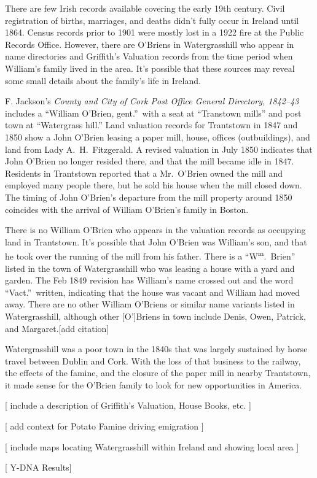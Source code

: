 There are few Irish records available covering the early 19th century. Civil registration of births, marriages, and deaths didn't fully occur in Ireland until 1864.\cite{Grenham1} Census records prior to 1901 were mostly lost in a 1922 fire at the Public Records Office.\cite{Grenham18} However, there are O'Briens in Watergrasshill who appear in name directories and Griffith's Valuation records from the time period when William's family lived in the area. It's possible that these sources may reveal some small details about the family's life in Ireland.

F. Jackson's \textit{County and City of Cork Post Office General Directory, 1842--43} includes a ``William O'Brien, gent.''\ with a seat at ``Transtown mills'' and post town at ``Watergrass hill.''\cite{Jacksons} Land valuation records for Trantstown in 1847 and 1850 show a John O'Brien leasing a paper mill, house, offices (outbuildings), and land from Lady A.\ H.\ Fitzgerald.\cite{Peramb1847,Peramb1850} A revised valuation in July 1850 indicates that John O'Brien no longer resided there, and that the mill became idle in 1847.\cite{House1850} Residents in Trantstown reported that a Mr.\ O'Brien owned the mill and employed many people there, but he sold his house when the mill closed down.\cite{PaperMill} The timing of John O'Brien's departure from the mill property around 1850 coincides with the arrival of William O'Brien's family in Boston.

There is no William O'Brien who appears in the valuation records as occupying land in Trantstown. It's possible that John O'Brien was William's son, and that he took over the running of the mill from his father. There is a ``W\textsuperscript{m}.\ Brien'' listed in the town of Watergrasshill who was leasing a house with a yard and garden. The Feb 1849 revision has William's name crossed out and the word ``Vact.''\ written, indicating that the house was vacant and William had moved away.\cite{House1849} There are no other William O'Briens or similar name variants listed in Watergrasshill, although other [O']Briens in town include Denis, Owen, Patrick, and Margaret.[add citation]

Watergrasshill was a poor town in the 1840s that was largely sustained by horse travel between Dublin and Cork. With the loss of that business to the railway, the effects of the famine, and the closure of the paper mill in nearby Trantstown, it made sense for the O'Brien family to look for new opportunities in America.



[ include a description of Griffith's Valuation, House Books, etc. ]

[ add context for Potato Famine driving emigration ]

[ include maps locating Watergrasshill within Ireland and showing local area ]

[ Y-DNA Results]
